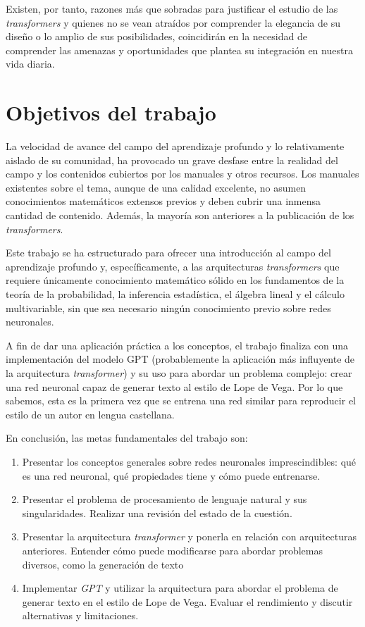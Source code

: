 Existen, por tanto, razones más que sobradas para justificar el estudio de las \textit{transformers} y quienes no se vean atraídos por comprender la elegancia de su diseño o lo amplio de sus posibilidades, coincidirán en la necesidad de comprender las amenazas y oportunidades que plantea su integración en nuestra vida diaria.

\section{Objetivos del trabajo}
La velocidad de avance del campo del aprendizaje profundo y lo relativamente aislado de su comunidad, ha provocado un grave desfase entre la realidad del campo y los contenidos cubiertos por los manuales y otros recursos. Los manuales existentes sobre el tema, aunque de una calidad excelente, no asumen conocimientos matemáticos extensos previos y deben cubrir una inmensa cantidad de contenido. Además, la mayoría son anteriores a la publicación de los \textit{transformers}.

Este trabajo se ha estructurado para ofrecer una introducción al campo del aprendizaje profundo y, específicamente, a las arquitecturas \textit{transformers} que requiere únicamente conocimiento matemático sólido en los fundamentos de la teoría de la probabilidad, la inferencia estadística, el álgebra lineal y el cálculo multivariable, sin que sea necesario ningún conocimiento previo sobre redes neuronales.

A fin de dar una aplicación práctica a los conceptos, el trabajo finaliza con una implementación del modelo GPT (probablemente la aplicación más influyente de la arquitectura \textit{transformer}) y su uso para abordar un problema complejo: crear una red neuronal capaz de generar texto al estilo de Lope de Vega. Por lo que sabemos, esta es la primera vez que se entrena una red similar para reproducir el estilo de un autor en lengua castellana.

En conclusión, las metas fundamentales del trabajo son:
\begin{enumerate}[label=(O\arabic*)]
    \setlength{\itemsep}{0pt}
    \setlength{\parskip}{0pt}
    \item Presentar los conceptos generales sobre redes neuronales imprescindibles: qué es una red neuronal, qué propiedades tiene y cómo puede entrenarse.
    \item Presentar el problema de procesamiento de lenguaje natural y sus singularidades. Realizar una revisión del estado de la cuestión.
    \item Presentar la arquitectura \textit{transformer} y ponerla en relación con arquitecturas anteriores. Entender cómo puede modificarse para abordar problemas diversos, como la generación de texto
    \item Implementar \textit{GPT} y utilizar la arquitectura para abordar el problema de generar texto en el estilo de Lope de Vega. Evaluar el rendimiento y discutir alternativas y limitaciones.
\end{enumerate}